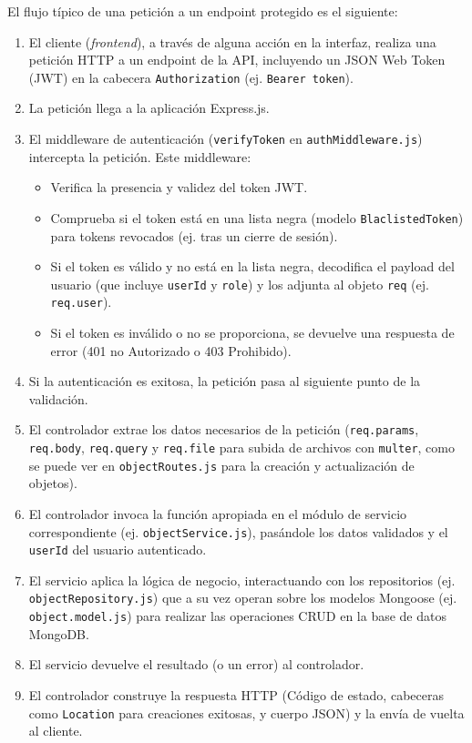 El flujo típico de una petición a un endpoint protegido es el siguiente:
\begin{enumerate}
    \item El cliente (\textit{frontend}), a través de alguna acción en la interfaz, realiza una petición HTTP a un endpoint de la API, incluyendo un JSON Web Token (JWT) en la cabecera \texttt{Authorization} (ej. \texttt{Bearer token}).
    \item La petición llega a la aplicación Express.js.
    \item El middleware de autenticación (\texttt{verifyToken} en \texttt{authMiddleware.js})  intercepta la petición. Este middleware:
    \begin{itemize}
        \item Verifica la presencia y validez del token JWT.
        \item Comprueba si el token está en una lista negra (modelo \texttt{BlaclistedToken}) para tokens revocados (ej. tras un cierre de sesión).
        \item Si el token es válido y no está en la lista negra, decodifica el payload del usuario (que incluye \texttt{userId} y \texttt{role}) y los adjunta al objeto \texttt{req} (ej. \texttt{req.user}).
        \item Si el token es inválido o no se proporciona, se devuelve una respuesta de error (401 no Autorizado o 403 Prohibido).
    \end{itemize}
    \item Si la autenticación es exitosa, la petición pasa al siguiente punto de la validación.
    \item El controlador extrae los datos necesarios de la petición (\texttt{req.params}, \texttt{req.body}, \texttt{req.query} y \texttt{req.file} para subida de archivos con \texttt{multer}, como se puede ver en \texttt{objectRoutes.js} para la creación y actualización de objetos).
    \item El controlador invoca la función apropiada en el módulo de servicio correspondiente (ej. \texttt{objectService.js}), pasándole los datos validados y el \texttt{userId} del usuario autenticado.
    \item El servicio aplica la lógica de negocio, interactuando con los repositorios (ej. \texttt{objectRepository.js}) que a su vez operan sobre los modelos Mongoose (ej. \texttt{object.model.js}) para realizar las operaciones CRUD en la base de datos MongoDB.
    \item El servicio devuelve el resultado (o un error) al controlador.
    \item El controlador construye la respuesta HTTP (Código de estado, cabeceras como \texttt{Location} para creaciones exitosas, y cuerpo JSON) y la envía de vuelta al cliente.
\end{enumerate}

